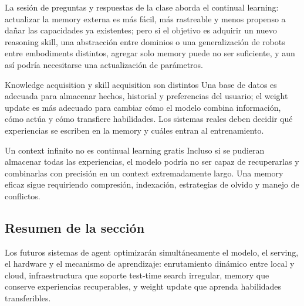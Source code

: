 La sesión de preguntas y respuestas de la clase aborda el continual learning: actualizar la memory externa es más fácil, más rastreable y menos propenso a dañar las capacidades ya existentes; pero si el objetivo es adquirir un nuevo reasoning skill, una abstracción entre dominios o una generalización de robots entre embodiments distintos, agregar solo memory puede no ser suficiente, y aun así podría necesitarse una actualización de parámetros.

\begin{knowledgebox}{Knowledge acquisition y skill acquisition son distintos}
Una base de datos es adecuada para almacenar hechos, historial y preferencias del usuario; el weight update es más adecuado para cambiar cómo el modelo combina información, cómo actúa y cómo transfiere habilidades. Los sistemas reales deben decidir qué experiencias se escriben en la memory y cuáles entran al entrenamiento.
\end{knowledgebox}

\begin{warningbox}{Un context infinito no es continual learning gratis}
Incluso si se pudieran almacenar todas las experiencias, el modelo podría no ser capaz de recuperarlas y combinarlas con precisión en un context extremadamente largo. Una memory eficaz sigue requiriendo compresión, indexación, estrategias de olvido y manejo de conflictos.
\end{warningbox}

\subsection{Resumen de la sección}

Los futuros sistemas de agent optimizarán simultáneamente el modelo, el serving, el hardware y el mecanismo de aprendizaje: enrutamiento dinámico entre local y cloud, infraestructura que soporte test-time search irregular, memory que conserve experiencias recuperables, y weight update que aprenda habilidades transferibles.

